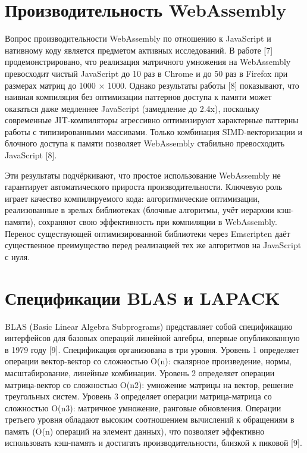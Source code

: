 \documentclass[12pt, oneside]{book}
\begin{document}
\section{Производительность WebAssembly}

    \quad Вопрос производительности WebAssembly по отношению к JavaScript и нативному коду является предметом активных исследований. В работе [7] продемонстрировано, что реализация матричного умножения на WebAssembly превосходит чистый JavaScript до 10 раз в Chrome и до 50 раз в Firefox при размерах матриц до 1000 × 1000. Однако результаты работы [8] показывают, что наивная компиляция без оптимизации паттернов доступа к памяти может оказаться даже медленнее JavaScript (замедление до 2.4x), поскольку современные JIT-компиляторы агрессивно оптимизируют характерные паттерны работы с типизированными массивами. Только комбинация SIMD-векторизации и блочного доступа к памяти позволяет WebAssembly стабильно превосходить JavaScript [8].
    
    \quad Эти результаты подчёркивают, что простое использование WebAssembly не гарантирует автоматического прироста производительности. Ключевую роль играет качество компилируемого кода: алгоритмические оптимизации, реализованные в зрелых библиотеках (блочные алгоритмы, учёт иерархии кэш-памяти), сохраняют свою эффективность при компиляции в WebAssembly. Перенос существующей оптимизированной библиотеки через Emscripten даёт существенное преимущество перед реализацией тех же алгоритмов на JavaScript с нуля.

\section{Спецификации BLAS и LAPACK}

    \quad BLAS (Basic Linear Algebra Subprograms) представляет собой спецификацию интерфейсов для базовых операций линейной алгебры, впервые опубликованную в 1979 году [9]. Спецификация организована в три уровня. Уровень 1 определяет операции вектор-вектор со сложностью O(n): скалярное произведение, нормы, масштабирование, линейные комбинации. Уровень 2 определяет операции матрица-вектор со сложностью O(n2): умножение матрицы на вектор, решение треугольных систем. Уровень 3 определяет операции матрица-матрица со сложностью O(n3): матричное умножение, ранговые обновления. Операции третьего уровня обладают высоким соотношением вычислений к обращениям в память (O(n) операций на элемент данных), что позволяет эффективно использовать кэш-память и достигать производительности, близкой к пиковой [9].
        
\end{document}
